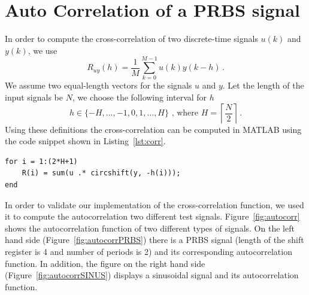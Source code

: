 \documentclass{scrartcl}
\begin{document}
\section{Auto Correlation of a PRBS signal}

In order to compute the cross-correlation of two discrete-time signals $u(k)$ and $y(k)$, we use 
\begin{equation}
	R_{uy}(h) = \frac{1}{M} \sum\limits_{k=0}^{M-1} u(k)y(k-h)\, .
\end{equation}
We assume two equal-length vectors for the signals $u$ and $y$. Let the length of the input signals be $N$, we choose the following interval for $h$
\begin{equation}
	h \in \{-H, \dots, -1, 0, 1, \dots, H\}\text{ , where } H = \left\lceil \frac{N}{2} \right\rceil \, .
\end{equation}
Using these definitions the cross-correlation can be computed in MATLAB using the code snippet shown in Listing~\ref{lst:corr}.

\begin{lstlisting}[caption={Computing a discrete-time cross correlation of the signal u and y in matlab},label={lst:corr}]
for i = 1:(2*H+1)
    R(i) = sum(u .* circshift(y, -h(i)));
end
\end{lstlisting}

In order to validate our implementation of the cross-correlation function, we used it to compute the autocorrelation two different test signals. 
Figure~\ref{fig:autocorr} shows the autocorrelation function of two different types of signals. 
On the left hand side (Figure~\ref{fig:autocorrPRBS}) there is a PRBS signal (length of the shift register is 4 and number of periods is 2) and its corresponding autocorrelation function. 
In addition, the figure on the right hand side (Figure~\ref{fig:autocorrSINUS}) displays a sinusoidal signal and its autocorrelation function.  
\end{document}
